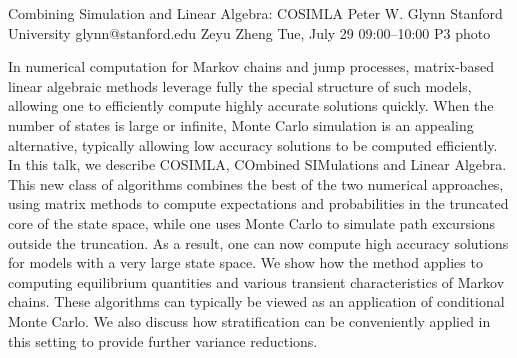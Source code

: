 \clearpage
\begin{talk}
  {Combining Simulation and Linear Algebra: COSIMLA}%
  {Peter W. Glynn}%
  {Stanford University}%
  {glynn@stanford.edu}%
  {Zeyu Zheng}%
  {}%
  {Tue, July 29 09:00–10:00}%
  {P3}%
  {photo}%
  
				
			
In numerical computation for Markov chains and jump processes, matrix-based linear algebraic methods leverage fully the special structure of such models, allowing one to efficiently compute highly accurate solutions quickly. When the number of states is large or infinite, Monte Carlo simulation is an appealing alternative, typically allowing low accuracy solutions to be computed efficiently. In this talk, we describe COSIMLA, COmbined SIMulations and Linear Algebra. This new class of algorithms combines the best of the two numerical approaches, using matrix methods to compute expectations and probabilities in the truncated core of the state space, while one uses Monte Carlo to simulate path excursions outside the truncation. As a result, one can now compute high accuracy solutions for models with a very large state space. We show how the method applies to computing equilibrium quantities and various transient characteristics of Markov chains. These algorithms can typically be viewed as an application of conditional Monte Carlo. We also discuss how stratification can be conveniently applied in this setting to provide further variance reductions.  

\end{talk}

